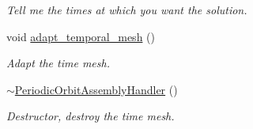 \begin{DoxyCompactItemize}
\begin{DoxyCompactList}\small\item\em Tell me the times at which you want the solution. \end{DoxyCompactList}\item 
void \hyperlink{classoomph_1_1PeriodicOrbitAssemblyHandler_a358d1749faa8ac7dd0de87340d878088}{adapt\+\_\+temporal\+\_\+mesh} ()
\begin{DoxyCompactList}\small\item\em Adapt the time mesh. \end{DoxyCompactList}\item 
\hyperlink{classoomph_1_1PeriodicOrbitAssemblyHandler_a919aba117d2e7f08d1462b9d00799782}{$\sim$\+Periodic\+Orbit\+Assembly\+Handler} ()
\begin{DoxyCompactList}\small\item\em Destructor, destroy the time mesh. \end{DoxyCompactList}\end{DoxyCompactItemize}
